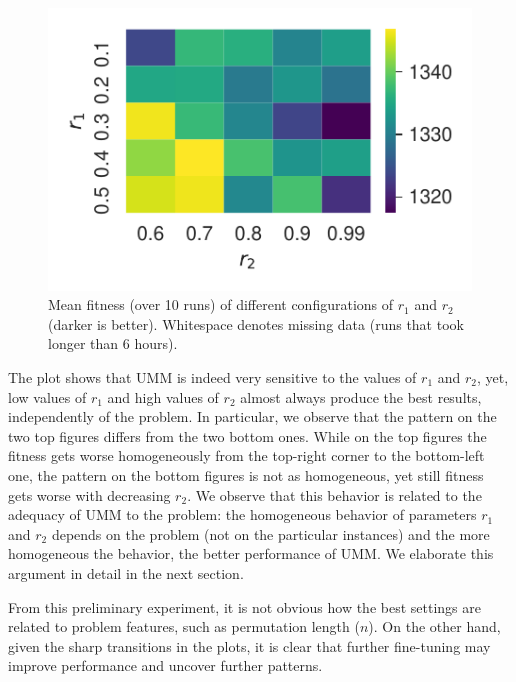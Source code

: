 \documentclass[sigconf,dvipsnames]{acmart}
\begin{document}
\begin{figure}[tb]
\begin{minipage}{0.49\linewidth}
  \includegraphics[width=\textwidth]{../img/heatmap_rec05}
\end{minipage}
\caption{Mean fitness (over 10 runs) of different configurations of $r_1$ and $r_2$ (darker is better). Whitespace denotes missing data (runs that took longer than 6 hours).\label{fig:heatmaps}}
\end{figure}

The plot shows that UMM is indeed very sensitive to the values of $r_1$ and
$r_2$, yet, low values of $r_1$ and high values of $r_2$ almost always produce
the best results, independently of the problem.  In particular, we observe that
the pattern on the two top figures differs from the two bottom ones. While on
the top figures the fitness gets worse homogeneously from the top-right corner
to the bottom-left one, the pattern on the bottom figures is not as homogeneous, yet
still fitness gets worse with decreasing $r_2$.  We observe that this behavior
is related to the adequacy of UMM to the problem: the homogeneous behavior of
parameters $r_1$ and $r_2$ depends on the problem (not on the particular
instances) and the more homogeneous the behavior, the better performance of
UMM. We elaborate this argument in detail in the next section.

From this preliminary experiment, it is not obvious how the best settings are
related to problem features, such as permutation length ($n$). On the other
hand, given the sharp transitions in the plots, it is clear that further
fine-tuning may improve performance and uncover further patterns.
\end{document}
